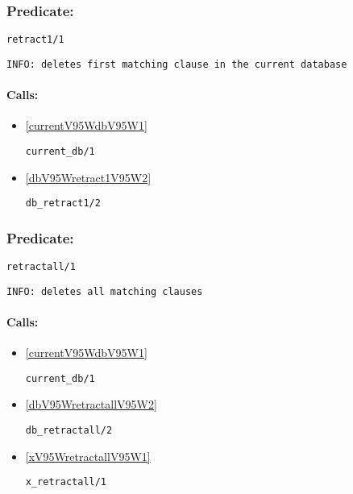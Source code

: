 \subsubsection{Predicate:} \label{retract1V95W1}

\begin{verbatim}
retract1/1
\end{verbatim}

{\small \begin{verbatim}
INFO: deletes first matching clause in the current database

\end{verbatim}}
\paragraph{Calls:} 
\begin{itemize}
\item \ref{currentV95WdbV95W1} 
\begin{verbatim}
current_db/1
\end{verbatim}

\item \ref{dbV95Wretract1V95W2} 
\begin{verbatim}
db_retract1/2
\end{verbatim}

\end{itemize}

\subsubsection{Predicate:} \label{retractallV95W1}

\begin{verbatim}
retractall/1
\end{verbatim}

{\small \begin{verbatim}
INFO: deletes all matching clauses

\end{verbatim}}
\paragraph{Calls:} 
\begin{itemize}
\item \ref{currentV95WdbV95W1} 
\begin{verbatim}
current_db/1
\end{verbatim}

\item \ref{dbV95WretractallV95W2} 
\begin{verbatim}
db_retractall/2
\end{verbatim}

\item \ref{xV95WretractallV95W1} 
\begin{verbatim}
x_retractall/1
\end{verbatim}

\end{itemize}
